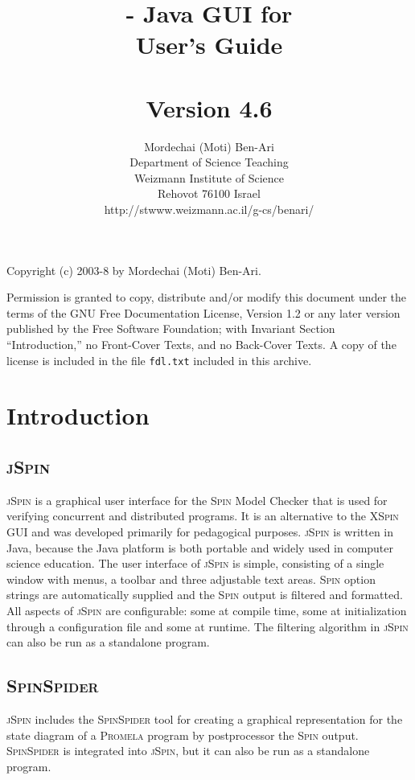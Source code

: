 \documentclass[11pt]{article}
\title{\js{} - Java GUI for \spn{}\\User's Guide\\\mbox{}\\\large{Version 4.6}}
\author{Mordechai (Moti) Ben-Ari\\
Department of Science Teaching\\
Weizmann Institute of Science\\
Rehovot 76100 Israel\\
\textsf{http://stwww.weizmann.ac.il/g-cs/benari/}}
\newcommand{\spn}{\textsc{Spin}}
\newcommand{\prm}{\textsc{Promela}}
\newcommand{\js}{\textsc{jSpin}}
\newcommand{\spd}{\textsc{SpinSpider}}
\newcommand{\p}[1]{\texttt{#1}}
\begin{document}
\maketitle
\thispagestyle{empty}

\vfill

\begin{center}
Copyright (c) 2003-8 by Mordechai (Moti) Ben-Ari.
\end{center}
Permission is granted to copy, distribute and/or modify this document
under the terms of the GNU Free Documentation License, Version 1.2
or any later version published by the Free Software Foundation;
with Invariant Section ``Introduction,'' no Front-Cover Texts, and no
Back-Cover Texts. A copy of the license is included in the file
\p{fdl.txt} included in this archive.
\newpage

\section{Introduction}

\subsection{\js{}}
\js{} is a graphical user interface for the \spn{} Model Checker that is
used for verifying concurrent and distributed programs. It is an
alternative to the \textsc{XSpin} GUI and was developed primarily for
pedagogical purposes. \js{} is written in Java, because the Java
platform is both portable and widely used in computer science education.
The user interface of \js{} is simple, consisting of a single window
with menus, a toolbar and three adjustable text areas. \spn{} option
strings are automatically supplied and the \spn{} output is filtered and
formatted. All aspects of \js{} are configurable: some at compile time,
some at initialization through a configuration file and some at runtime.
The filtering algorithm in \js{} can also be run as a standalone
program.

\subsection{\spd{}}
\js{} includes the \spd{} tool for creating a graphical representation for
the state diagram of a \prm{} program by postprocessor the \spn{} output. 
\spd{} is integrated into \js{}, but it can also be run as a standalone program.
\end{document}

